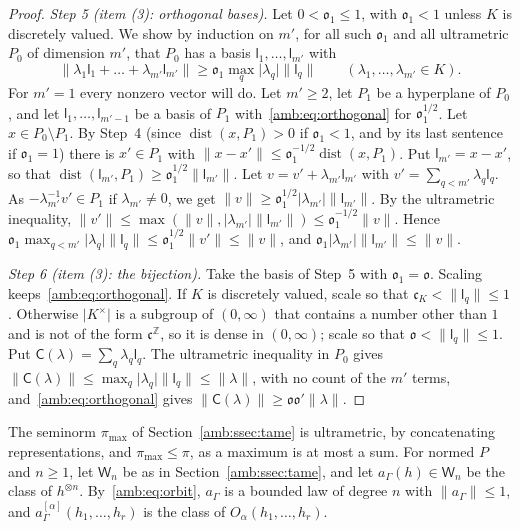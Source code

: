 \documentclass[11pt]{amsart}
\theoremstyle{definition}
\theoremstyle{remark}
\numberwithin{equation}{section}
\newcommand{\Z}{\mathbb Z}
\newcommand{\abs}[1]{\lvert #1\rvert}
\newcommand{\norm}[1]{\lVert #1\rVert}
\theoremstyle{plain}
\theoremstyle{definition}
\theoremstyle{plain}
\begin{document}
\begin{proof}
\emph{Step 5 (item (3): orthogonal bases).} Let $0<\mathfrak o_1\le1$, with $\mathfrak o_1<1$ unless $K$ is discretely
valued. We show by induction on $m'$, for all such $\mathfrak o_1$ and all ultrametric $P_0$ of dimension $m'$, that $P_0$ has
a basis $\mathsf l_1,\dots,\mathsf l_{m'}$ with
\begin{equation}\label{amb:eq:orthogonal}
 \norm{\lambda_1\mathsf l_1+\dots+\lambda_{m'}\mathsf l_{m'}}\ge\mathfrak o_1\max_q\abs{\lambda_q}\norm{\mathsf l_q}
 \qquad(\lambda_1,\dots,\lambda_{m'}\in K).
\end{equation}
For $m'=1$ every nonzero vector will do. Let $m'\ge2$, let $P_1$ be a hyperplane of $P_0$, and let
$\mathsf l_1,\dots,\mathsf l_{m'-1}$ be a basis of $P_1$ with~\eqref{amb:eq:orthogonal} for $\mathfrak o_1^{1/2}$. Let
$x\in P_0\setminus P_1$. By Step~4 (since $\operatorname{dist}(x,P_1)>0$ if $\mathfrak o_1<1$, and by its last sentence if $\mathfrak o_1=1$) there is $x'\in P_1$ with $\norm{x-x'}\le\mathfrak o_1^{-1/2}\operatorname{dist}(x,P_1)$.
Put $\mathsf l_{m'}=x-x'$, so that $\operatorname{dist}(\mathsf l_{m'},P_1)\ge\mathfrak o_1^{1/2}\norm{\mathsf l_{m'}}$. Let
$v=v'+\lambda_{m'}\mathsf l_{m'}$ with $v'=\sum_{q<m'}\lambda_q\mathsf l_q$. As $-\lambda_{m'}^{-1}v'\in P_1$ if
$\lambda_{m'}\ne0$, we get $\norm v\ge\mathfrak o_1^{1/2}\abs{\lambda_{m'}}\norm{\mathsf l_{m'}}$. By the ultrametric
inequality, $\norm{v'}\le\max(\norm v,\abs{\lambda_{m'}}\norm{\mathsf l_{m'}})\le\mathfrak o_1^{-1/2}\norm v$. Hence
$\mathfrak o_1\max_{q<m'}\abs{\lambda_q}\norm{\mathsf l_q}\le\mathfrak o_1^{1/2}\norm{v'}\le\norm v$, and
$\mathfrak o_1\abs{\lambda_{m'}}\norm{\mathsf l_{m'}}\le\norm v$.

\emph{Step 6 (item (3): the bijection).} Take the basis of Step~5 with $\mathfrak o_1=\mathfrak o$. Scaling keeps~\eqref{amb:eq:orthogonal}. If $K$
is discretely valued, scale so that $\mathfrak c_K<\norm{\mathsf l_q}\le1$. Otherwise $\abs{K^\times}$ is a subgroup of $(0,\infty)$ that contains a number other than $1$ and is not of the form $\mathfrak c^{\Z}$, so it is dense in
$(0,\infty)$; scale so that $\mathfrak o<\norm{\mathsf l_q}\le1$. Put $\mathsf C(\lambda)=\sum_q\lambda_q\mathsf l_q$. The
ultrametric inequality in $P_0$ gives $\norm{\mathsf C(\lambda)}\le\max_q\abs{\lambda_q}\norm{\mathsf l_q}\le\norm\lambda$,
with no count of the $m'$ terms, and~\eqref{amb:eq:orthogonal} gives
$\norm{\mathsf C(\lambda)}\ge\mathfrak o\mathfrak o'\norm\lambda$.
\end{proof}

The seminorm $\pi_{\max}$ of Section~\ref{amb:ssec:tame} is ultrametric, by concatenating representations, and
$\pi_{\max}\le\pi$, as a maximum is at most a sum. For normed $P$ and $n\ge1$, let $\mathsf W_n$ be as in Section~\ref{amb:ssec:tame}, and let
$a_\Gamma(h)\in \mathsf W_n$ be the class of $h^{\otimes n}$. By~\eqref{amb:eq:orbit}, $a_\Gamma$ is a bounded law of degree $n$ with
$\norm{a_\Gamma}\le1$, and $a_\Gamma^{[\alpha]}(h_1,\dots,h_r)$ is the class of $O_\alpha(h_1,\dots,h_r)$.
\end{document}
